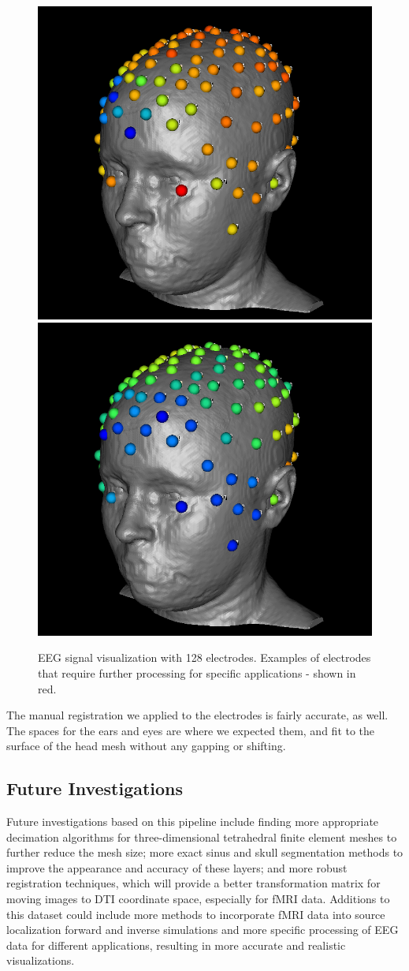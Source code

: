 \begin{figure}[H]
\begin{center}
\includegraphics[width=.49\textwidth]{Figures/128_eeg_1}
\includegraphics[width=.49\textwidth]{Figures/128_eeg_2}
\caption{EEG signal visualization with 128 electrodes. Examples of electrodes that require further processing for specific applications - shown in red.}
\label{fig:eegvis}
\end{center}
\end{figure}

The manual registration we applied to the electrodes is fairly accurate, as well. The spaces for the ears and eyes are where we expected them, and fit to the surface of the head mesh without any gapping or shifting. 

\subsection{Future Investigations}

Future investigations based on this pipeline include finding more appropriate decimation algorithms for three-dimensional tetrahedral finite element meshes to further reduce the mesh size; more exact sinus and skull segmentation methods to improve the appearance and accuracy of these layers; and more robust registration techniques, which will provide a better transformation matrix for moving images to DTI coordinate space, especially for fMRI data. Additions to this dataset could include more methods to incorporate fMRI data into source localization forward and inverse simulations and more specific processing of EEG data for different applications, resulting in more accurate and realistic visualizations. 


